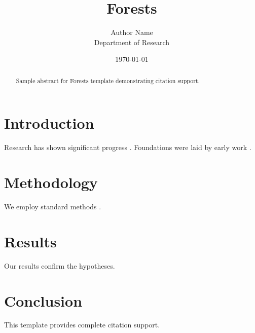 \documentclass{mdpi}
\title{Forests}
\author{Author Name \\ \small Department of Research}
\date{\today}
\begin{document}
\maketitle

\begin{abstract}
Sample abstract for Forests template demonstrating citation support.
\end{abstract}

\section{Introduction}
Research has shown significant progress \citep{einstein1905}. Foundations were laid by early work \citep{turing1950}.

\section{Methodology}
We employ standard methods \citep{knuth1984}.

\section{Results}
Our results confirm the hypotheses.

\section{Conclusion}
This template provides complete citation support.



\end{document}
